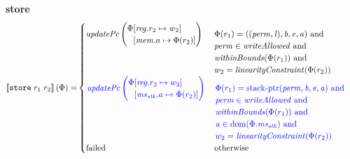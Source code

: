 \documentclass[a4paper]{article}
\begin{document}
\noindent\textbf{store}\\
\begin{align*}
  \sem{\tstore{r_1}{r_2}}(\Phi) = &
                                    \begin{cases}
                                      \updPcAddr{}\left(
                                        \arraycolsep=0pt
                                        \begin{array}{rl}
                                          \Phi&\updReg{r_2}{w_2}\\
                                              &\update{\mem.a}{\Phi(r_2)}
                                        \end{array}
\right) & 
                                      \arraycolsep=0pt
                                      \begin{array}[t]{l}
                                        \Phi(r_1) = ((\perm,\lin),\baddr,\eaddr,\aaddr) \tand \\
                                        \perm \in \writeAllowed{} \tand\\
                                        \withinBounds{\Phi(r_1)} \tand \\
                                        w_2 = \linCons{\Phi(r_2)}
                                      \end{array}
                                      \\
                                      \sourcecolor\left.
                                      \updPcAddr{}\left(
                                      \arraycolsep=0pt
                                      \begin{array}{rl}
                                        \Phi&\updReg{r_2}{w_2}\\
                                            &\update{\ms_\stk.a}{\Phi(r_2)}
                                      \end{array}
                                      \right) \right.& 
                                      \sourcecolor\left.
                                      \arraycolsep=0pt
                                      \begin{array}[t]{l}
                                        \Phi(r_1) = \stkptr{\perm,\baddr,\eaddr,\aaddr} \tand \\
                                        \perm \in \writeAllowed{} \tand \\
                                        \withinBounds{\Phi(r_1)} \tand \\
                                        \aaddr \in \dom(\Phi.\ms_\stk) \tand \\ %
                                        w_2 = \linCons{\Phi(r_2)}
                                      \end{array}\right.\\
                                      \failed & \totherwise
                                    \end{cases}
\end{align*}
\end{document}
